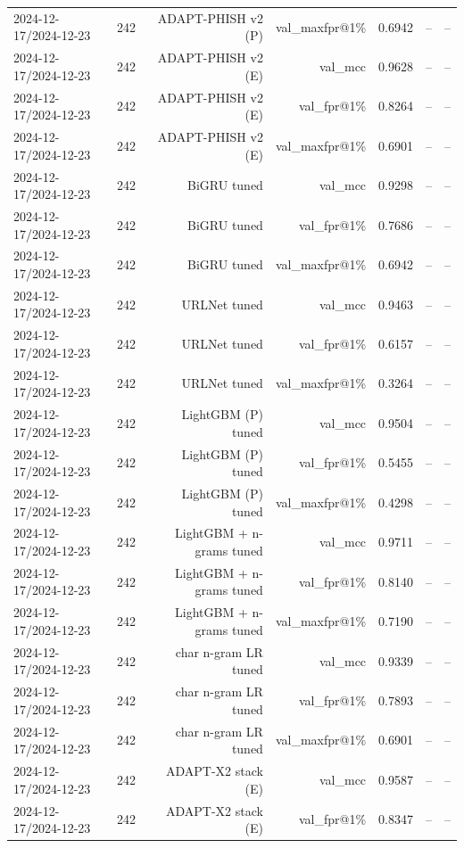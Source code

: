 \begin{table}[t]
\begin{tabular}{llrrrrr}
2024-12-17/2024-12-23 & 242 & ADAPT-PHISH v2 (P) & val\_maxfpr@1\% & 0.6942 & -- & -- \\
2024-12-17/2024-12-23 & 242 & ADAPT-PHISH v2 (E) & val\_mcc & 0.9628 & -- & -- \\
2024-12-17/2024-12-23 & 242 & ADAPT-PHISH v2 (E) & val\_fpr@1\% & 0.8264 & -- & -- \\
2024-12-17/2024-12-23 & 242 & ADAPT-PHISH v2 (E) & val\_maxfpr@1\% & 0.6901 & -- & -- \\
2024-12-17/2024-12-23 & 242 & BiGRU tuned & val\_mcc & 0.9298 & -- & -- \\
2024-12-17/2024-12-23 & 242 & BiGRU tuned & val\_fpr@1\% & 0.7686 & -- & -- \\
2024-12-17/2024-12-23 & 242 & BiGRU tuned & val\_maxfpr@1\% & 0.6942 & -- & -- \\
2024-12-17/2024-12-23 & 242 & URLNet tuned & val\_mcc & 0.9463 & -- & -- \\
2024-12-17/2024-12-23 & 242 & URLNet tuned & val\_fpr@1\% & 0.6157 & -- & -- \\
2024-12-17/2024-12-23 & 242 & URLNet tuned & val\_maxfpr@1\% & 0.3264 & -- & -- \\
2024-12-17/2024-12-23 & 242 & LightGBM (P) tuned & val\_mcc & 0.9504 & -- & -- \\
2024-12-17/2024-12-23 & 242 & LightGBM (P) tuned & val\_fpr@1\% & 0.5455 & -- & -- \\
2024-12-17/2024-12-23 & 242 & LightGBM (P) tuned & val\_maxfpr@1\% & 0.4298 & -- & -- \\
2024-12-17/2024-12-23 & 242 & LightGBM + n-grams tuned & val\_mcc & 0.9711 & -- & -- \\
2024-12-17/2024-12-23 & 242 & LightGBM + n-grams tuned & val\_fpr@1\% & 0.8140 & -- & -- \\
2024-12-17/2024-12-23 & 242 & LightGBM + n-grams tuned & val\_maxfpr@1\% & 0.7190 & -- & -- \\
2024-12-17/2024-12-23 & 242 & char n-gram LR tuned & val\_mcc & 0.9339 & -- & -- \\
2024-12-17/2024-12-23 & 242 & char n-gram LR tuned & val\_fpr@1\% & 0.7893 & -- & -- \\
2024-12-17/2024-12-23 & 242 & char n-gram LR tuned & val\_maxfpr@1\% & 0.6901 & -- & -- \\
2024-12-17/2024-12-23 & 242 & ADAPT-X2 stack (E) & val\_mcc & 0.9587 & -- & -- \\
2024-12-17/2024-12-23 & 242 & ADAPT-X2 stack (E) & val\_fpr@1\% & 0.8347 & -- & -- \\

\end{tabular}
\end{table}
